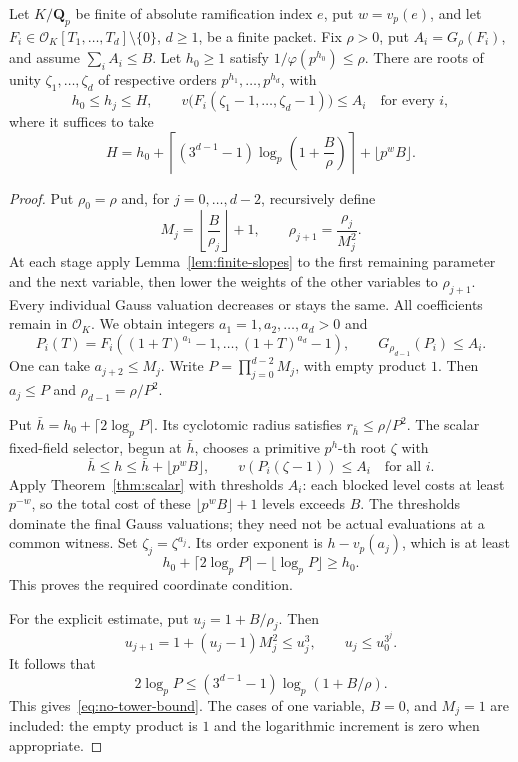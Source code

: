 \begin{theorem}
\label{thm:no-tower}
Let $K/\mathbf Q_p$ be finite of absolute ramification index $e$, put $w=v_p(e)$, and let
$F_i\in\mathcal O_K[T_1,\ldots,T_d]\setminus\{0\}$, $d\ge1$, be a finite
packet. Fix $\rho>0$, put $A_i=G_\rho(F_i)$, and assume
$\sum_i A_i\le B$. Let $h_0\ge1$ satisfy
$1/\varphi(p^{h_0})\le\rho$.
There are roots of unity
$\zeta_1,\ldots,\zeta_d$ of respective orders $p^{h_1},\ldots,p^{h_d}$,
with
\[
 h_0\le h_j\le H,\qquad
 v\bigl(F_i(\zeta_1-1,\ldots,\zeta_d-1)\bigr)\le A_i
 \quad\text{for every }i,
\]
where it suffices to take
\begin{equation}\label{eq:no-tower-bound}
 H=h_0+
 \left\lceil(3^{d-1}-1)\log_p\!\left(1+\frac B\rho\right)\right\rceil
 +\lfloor p^w B\rfloor.
\end{equation}
\end{theorem}

\begin{proof}
Put $\rho_0=\rho$ and, for $j=0,\ldots,d-2$, recursively define
\[
 M_j=\left\lfloor\frac B{\rho_j}\right\rfloor+1,
 \qquad \rho_{j+1}=\frac{\rho_j}{M_j^2}.
\]
At each stage apply Lemma~\ref{lem:finite-slopes} to the first remaining
parameter and the next variable, then lower the weights of the other
variables to $\rho_{j+1}$. Every individual Gauss valuation decreases or
stays the same. All coefficients remain in $\mathcal O_K$.
We obtain integers $a_1=1,a_2,\ldots,a_d>0$ and
\[
 P_i(T)=F_i((1+T)^{a_1}-1,\ldots,(1+T)^{a_d}-1),
 \qquad G_{\rho_{d-1}}(P_i)\le A_i.
\]
One can take $a_{j+2}\le M_j$. Write
$P=\prod_{j=0}^{d-2}M_j$, with empty product $1$. Then $a_j\le P$ and
$\rho_{d-1}=\rho/P^2$.

Put $\bar h=h_0+\lceil2\log_pP\rceil$. Its cyclotomic radius satisfies
$r_{\bar h}\le\rho/P^2$. The scalar fixed-field selector, begun at
$\bar h$, chooses a primitive $p^h$-th root $\zeta$ with
\[
 \bar h\le h\le\bar h+\lfloor p^w B\rfloor,
 \qquad v(P_i(\zeta-1))\le A_i \quad\text{for all }i.
\]
Apply Theorem~\ref{thm:scalar} with thresholds $A_i$: each blocked level costs at least $p^{-w}$, so the total cost of these $\lfloor p^w B\rfloor+1$ levels exceeds $B$. The thresholds dominate the final Gauss valuations; they need not be actual evaluations at a common witness.
Set $\zeta_j=\zeta^{a_j}$. Its order exponent is
$h-v_p(a_j)$, which is at least
\[
 h_0+\lceil2\log_pP\rceil-\lfloor\log_pP\rfloor\ge h_0.
\]
This proves the required coordinate condition.

For the explicit estimate, put $u_j=1+B/\rho_j$. Then
\[
 u_{j+1}=1+(u_j-1)M_j^2\le u_j^3,
 \qquad u_j\le u_0^{3^j}.
\]
It follows that
\[
 2\log_pP\le(3^{d-1}-1)\log_p(1+B/\rho).
\]
This gives~\eqref{eq:no-tower-bound}. The cases of one variable, $B=0$, and $M_j=1$ are included: the empty product is $1$ and the logarithmic increment is zero when appropriate.
\end{proof}

